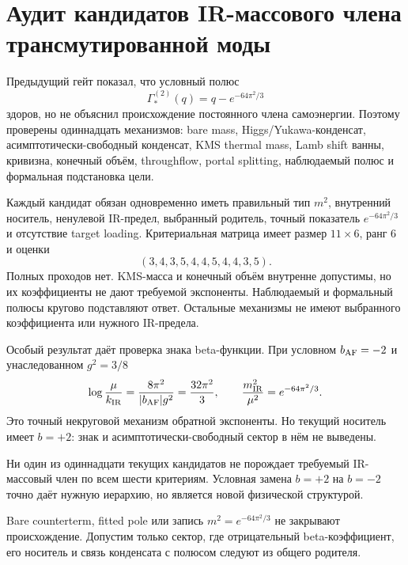 \chapter{Аудит кандидатов IR-массового члена трансмутированной моды}
\label{ch:v10-discrete-resolution-transmuted-ir-mass-audit}

Предыдущий гейт показал, что условный полюс
\begin{equation}
 \Gamma_*^{(2)}(q)=q-e^{-64\pi^2/3}
\end{equation}
здоров, но не объяснил происхождение постоянного члена самоэнергии. Поэтому
проверены одиннадцать механизмов: bare mass, Higgs/Yukawa-конденсат,
асимптотически-свободный конденсат, KMS thermal mass, Lamb shift ванны,
кривизна, конечный объём, throughflow, portal splitting, наблюдаемый полюс
и формальная подстановка цели.

Каждый кандидат обязан одновременно иметь правильный тип $m^2$, внутренний
носитель, ненулевой IR-предел, выбранный родитель, точный показатель
$e^{-64\pi^2/3}$ и отсутствие target loading. Критериальная матрица имеет
размер $11\times6$, ранг $6$ и оценки
\begin{equation}
 (3,4,3,5,4,4,5,4,4,3,5).
\end{equation}
Полных проходов нет. KMS-масса и конечный объём внутренне допустимы, но их
коэффициенты не дают требуемой экспоненты. Наблюдаемый и формальный полюсы
кругово подставляют ответ. Остальные механизмы не имеют выбранного
коэффициента или нужного IR-предела.

Особый результат даёт проверка знака beta-функции. При условном
$b_{\rm AF}=-2$ и унаследованном $g^2=3/8$
\begin{equation}
 \log\frac{\mu}{k_{\rm IR}}
 =\frac{8\pi^2}{|b_{\rm AF}|g^2}
 =\frac{32\pi^2}{3},\qquad
 \frac{m_{\rm IR}^2}{\mu^2}=e^{-64\pi^2/3}.
\end{equation}
Это точный некруговой механизм обратной экспоненты. Но текущий носитель
имеет $b=+2$: знак и асимптотически-свободный сектор в нём не выведены.

\begin{theorem}
Ни один из одиннадцати текущих кандидатов не порождает требуемый IR-массовый
член по всем шести критериям. Условная замена $b=+2$ на $b=-2$ точно даёт
нужную иерархию, но является новой физической структурой.
\end{theorem}

\begin{nogocriterion}
Bare counterterm, fitted pole или запись $m^2=e^{-64\pi^2/3}$ не закрывают
происхождение. Допустим только сектор, где отрицательный beta-коэффициент,
его носитель и связь конденсата с полюсом следуют из общего родителя.
\end{nogocriterion}

